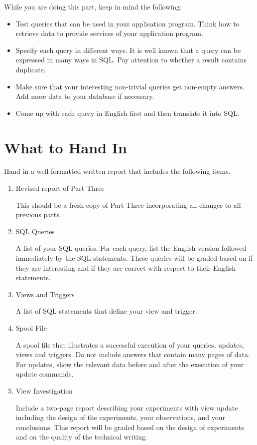 \documentclass[11pt]{article}
\begin{document}
  While you are doing this part, keep in mind the following:
  
\begin{itemize}
\item Test queries that can be used in your application program. Think
    how to retrieve data to provide services of your application
    program.
\item Specify each query in different ways. It is well known that a
    query can be expressed in many ways in SQL. Pay attention to
    whether a result contains duplicate.
\item Make sure that your interesting non-trivial queries get non-empty
    answers. Add more data to your database if necessary.
\item Come up with each query in English first and then translate it
    into SQL.
\end{itemize}
\section*{What to Hand In}
\label{sec-2}


Hand in a well-formatted written report that includes the following
items.

\begin{enumerate}
\item Revised report of Part Three

   This should be a fresh copy of Part Three incorporating all changes
   to all previous parts.
\item SQL Queries
   
   A list of your SQL queries. For each query, list the English
   version followed immediately by the SQL statements. These queries
   will be graded based on if they are interesting and if they are
   correct with respect to their English statements.
\item Views and Triggers

   A list of SQL statements that define your view and trigger.
\item Spool File

   A spool file that illustrates a successful execution of your
   queries, updates, views and triggers. Do not include answers that
   contain many pages of data. For updates, show the relevant data
   before and after the execution of your update commands.
\item View Investigation
   
   Include a two-page report describing your experiments with view
   update including the design of the experiments, your observations,
   and your conclusions. This report will be graded based on the
   design of experiments and on the quality of the technical writing.
\end{enumerate}
\end{document}
